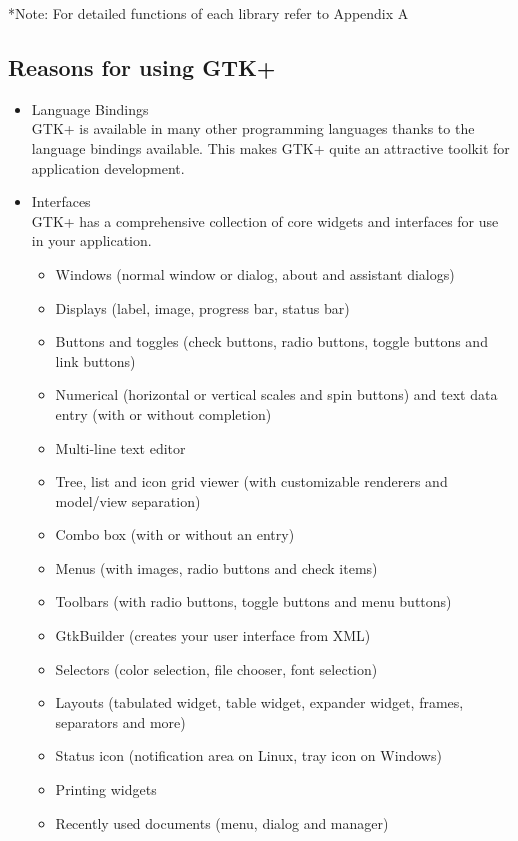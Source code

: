 \documentclass[12pt]{article}
\begin{document}
*Note: For detailed functions of each library refer to Appendix A




\subsection{Reasons for using GTK+}

\begin{itemize}

\item Language Bindings\\
GTK+ is available in many other programming languages thanks to the language bindings available. This makes GTK+ quite an attractive toolkit for application development.

\item Interfaces \\
GTK+ has a comprehensive collection of core widgets and interfaces for use in your application.

\begin{itemize}

\item Windows (normal window or dialog, about and assistant dialogs)
\item Displays (label, image, progress bar, status bar)
\item Buttons and toggles (check buttons, radio buttons, toggle buttons and link buttons)
\item Numerical (horizontal or vertical scales and spin buttons) and text data entry (with or without completion)
\item Multi-line text editor
\item Tree, list and icon grid viewer (with customizable renderers and model/view separation)
\item Combo box (with or without an entry)
\item Menus (with images, radio buttons and check items)
\item Toolbars (with radio buttons, toggle buttons and menu buttons)
\item GtkBuilder (creates your user interface from XML)
\item Selectors (color selection, file chooser, font selection)
\item Layouts (tabulated widget, table widget, expander widget, frames, separators and more)
\item Status icon (notification area on Linux, tray icon on Windows)
\item Printing widgets
\item Recently used documents (menu, dialog and manager)


\end{itemize}


\end{itemize}
\end{document}
